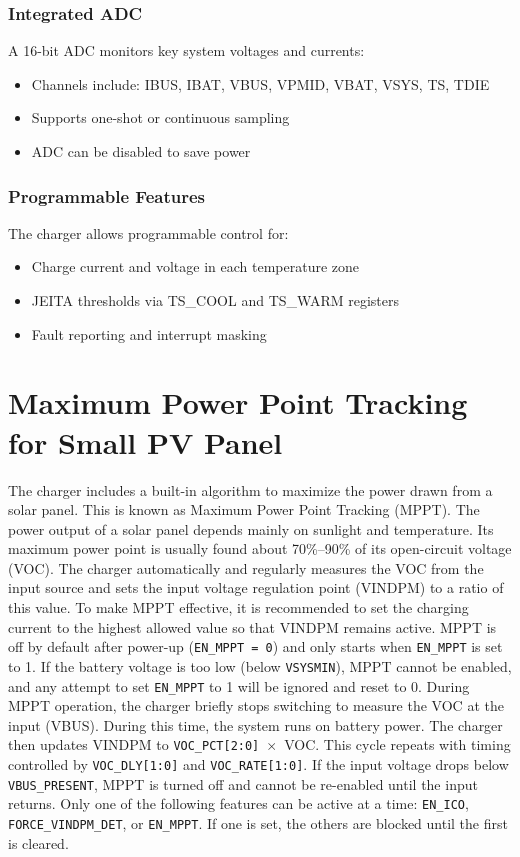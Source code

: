\documentclass[12pt]{article}
\begin{document}
\subsubsection*{Integrated ADC}
A 16-bit ADC monitors key system voltages and currents:
\begin{itemize}
    \item Channels include: IBUS, IBAT, VBUS, VPMID, VBAT, VSYS, TS, TDIE
    \item Supports one-shot or continuous sampling
    \item ADC can be disabled to save power
\end{itemize}

\subsubsection*{Programmable Features}
The charger allows programmable control for:
\begin{itemize}
    \item Charge current and voltage in each temperature zone
    \item JEITA thresholds via TS\_COOL and TS\_WARM registers
    \item Fault reporting and interrupt masking
\end{itemize}

\section{Maximum Power Point Tracking for Small PV Panel}

The charger includes a built-in algorithm to maximize the power drawn from a solar panel. This is known as Maximum Power Point Tracking (MPPT). The power output of a solar panel depends mainly on sunlight and temperature. Its maximum power point is usually found about 70\%--90\% of its open-circuit voltage (VOC).
The charger automatically and regularly measures the VOC from the input source and sets the input voltage regulation point (VINDPM) to a ratio of this value. To make MPPT effective, it is recommended to set the charging current to the highest allowed value so that VINDPM remains active. MPPT is off by default after power-up (\texttt{EN\_MPPT = 0}) and only starts when \texttt{EN\_MPPT} is set to 1.
If the battery voltage is too low (below \texttt{VSYSMIN}), MPPT cannot be enabled, and any attempt to set \texttt{EN\_MPPT} to 1 will be ignored and reset to 0.
During MPPT operation, the charger briefly stops switching to measure the VOC at the input (VBUS). During this time, the system runs on battery power. The charger then updates VINDPM to \texttt{VOC\_PCT[2:0]}~$\times$~VOC. This cycle repeats with timing controlled by \texttt{VOC\_DLY[1:0]} and \texttt{VOC\_RATE[1:0]}.
If the input voltage drops below \texttt{VBUS\_PRESENT}, MPPT is turned off and cannot be re-enabled until the input returns.
Only one of the following features can be active at a time: \texttt{EN\_ICO}, \texttt{FORCE\_VINDPM\_DET}, or \texttt{EN\_MPPT}. If one is set, the others are blocked until the first is cleared.
\end{document}
